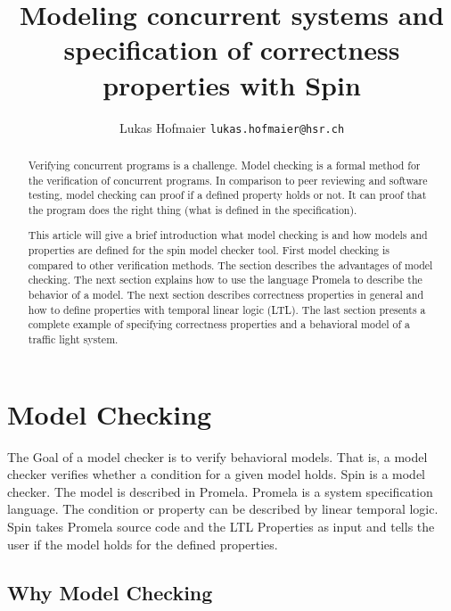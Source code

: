 \documentclass[a4paper, twoside]{article}
\begin{document}
\lstset{
basicstyle=\small\ttfamily,
xleftmargin=3.5em,
language=Promela
}

\title{Modeling concurrent systems and specification of correctness properties with Spin}
\author{Lukas Hofmaier \texttt{lukas.hofmaier@hsr.ch}}

\maketitle

\begin{abstract}
  Verifying concurrent programs is a challenge. Model checking is a formal method for the verification of concurrent programs. In comparison to peer reviewing and software testing, model checking can proof if a defined property holds or not. It can proof that the program does the right thing (what is defined in the specification).

This article will give a brief introduction what model checking is and how models and properties are defined for the spin model checker tool. First model checking is compared to other verification methods. The section describes the advantages of model checking. The next section explains how to use the language Promela to describe the behavior of a model. The next section describes correctness properties in general and how to define properties with temporal linear logic (LTL). The last section presents a complete example of specifying correctness properties and a behavioral model of a traffic light system.
\end{abstract}

\section{Model Checking}
\label{sec:modelchecking}

The Goal of a model checker is to verify behavioral models. That is, a model checker verifies whether a condition for a given model holds. Spin is a model checker. The model is described in Promela. Promela is a system specification language. The condition or property can be described by linear temporal logic.  Spin takes Promela source code and the LTL Properties as input and tells the user if the model holds for the defined properties.

\subsection{Why Model Checking}
\label{sec:why}
\end{document}

